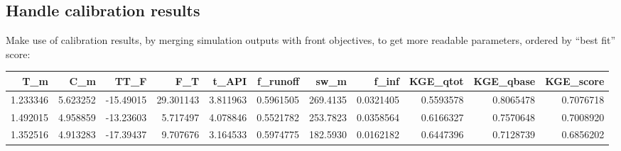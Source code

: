 \documentclass[
]{book}
\newenvironment{Shaded}{\begin{snugshade}}{\end{snugshade}}
\newcommand{\AttributeTok}[1]{\textcolor[rgb]{0.13,0.29,0.53}{#1}}
\newcommand{\CommentTok}[1]{\textcolor[rgb]{0.56,0.35,0.01}{\textit{#1}}}
\newcommand{\ConstantTok}[1]{\textcolor[rgb]{0.56,0.35,0.01}{#1}}
\newcommand{\DecValTok}[1]{\textcolor[rgb]{0.00,0.00,0.81}{#1}}
\newcommand{\FloatTok}[1]{\textcolor[rgb]{0.00,0.00,0.81}{#1}}
\newcommand{\FunctionTok}[1]{\textcolor[rgb]{0.13,0.29,0.53}{\textbf{#1}}}
\newcommand{\NormalTok}[1]{#1}
\newcommand{\OtherTok}[1]{\textcolor[rgb]{0.56,0.35,0.01}{#1}}
\newcommand{\SpecialCharTok}[1]{\textcolor[rgb]{0.81,0.36,0.00}{\textbf{#1}}}
\newcommand{\StringTok}[1]{\textcolor[rgb]{0.31,0.60,0.02}{#1}}
\begin{document}
\hypertarget{handle-calibration-results}{%
\subsection{Handle calibration results}\label{handle-calibration-results}}

Make use of calibration results, by merging simulation outputs with front objectives, to get more readable parameters, ordered by ``best fit'' score:

\begin{Shaded}
\end{Shaded}

\begin{tabular}{r|r|r|r|r|r|r|r|r|r|r}
\hline
T\_m & C\_m & TT\_F & F\_T & t\_API & f\_runoff & sw\_m & f\_inf & KGE\_qtot & KGE\_qbase & KGE\_score\\
\hline
1.233346 & 5.623252 & -15.49015 & 29.301143 & 3.811963 & 0.5961505 & 269.4135 & 0.0321405 & 0.5593578 & 0.8065478 & 0.7076718\\
\hline
1.492015 & 4.958859 & -13.23603 & 5.717497 & 4.078846 & 0.5521782 & 253.7823 & 0.0358564 & 0.6166327 & 0.7570648 & 0.7008920\\
\hline
1.352516 & 4.913283 & -17.39437 & 9.707676 & 3.164533 & 0.5974775 & 182.5930 & 0.0162182 & 0.6447396 & 0.7128739 & 0.6856202\\
\hline
\end{tabular}
\end{document}
